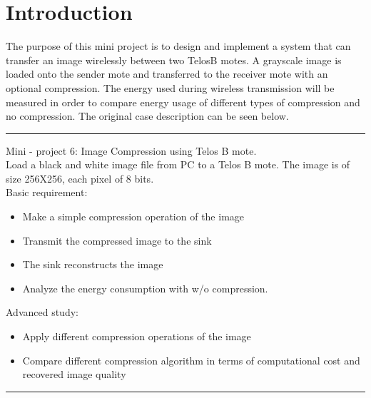 \section{Introduction}
The purpose of this mini project is to design and implement a system that can transfer an image wirelessly between two TelosB motes. A grayscale image is loaded onto the sender mote and transferred to the receiver mote with an optional compression. The energy used during wireless transmission will be measured in order to compare energy usage of different types of compression and no compression. The original case description can be seen below.

\begin{center}
\noindent\rule{4cm}{0.4pt}
\end{center}
Mini - project 6: Image Compression using Telos B mote.\\
Load a black and white image file from PC to a Telos B mote. The image is of size 256X256, each pixel of 8 bits.\\
Basic requirement:
\begin{itemize}
\item Make a simple compression operation of the image
\item Transmit the compressed image to the sink
\item The sink reconstructs the image
\item Analyze the energy consumption with w/o compression. 
\end{itemize}
Advanced study:
\begin{itemize}
\item Apply different compression operations of the image
\item Compare different compression algorithm in terms of computational cost and recovered image quality
\end{itemize}
\begin{center}
\noindent\rule{4cm}{0.4pt}
\end{center}

